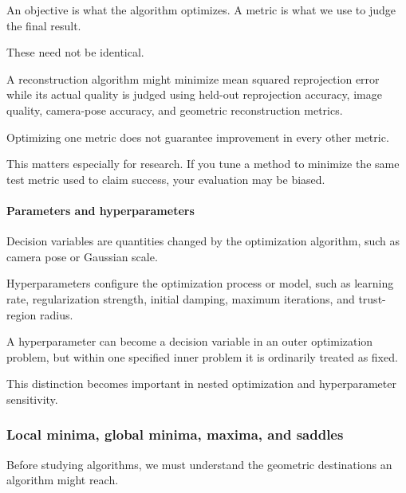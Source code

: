 \hypertarget{02-foundations-ii-ch026-objective-functions-versus-evaluation-metrics}{}

An objective is what the algorithm optimizes. A metric is what we use to judge the final result.

These need not be identical.

A reconstruction algorithm might minimize mean squared reprojection error while its actual quality is judged using held-out reprojection accuracy, image quality, camera-pose accuracy, and geometric reconstruction metrics.

Optimizing one metric does not guarantee improvement in every other metric.

This matters especially for research. If you tune a method to minimize the same test metric used to claim success, your evaluation may be biased.

\paragraph{Parameters and hyperparameters}\label{02-foundations-ii-ch026-parameters-and-hyperparameters}

\hypertarget{02-foundations-ii-ch026-parameters-and-hyperparameters}{}

Decision variables are quantities changed by the optimization algorithm, such as camera pose or Gaussian scale.

Hyperparameters configure the optimization process or model, such as learning rate, regularization strength, initial damping, maximum iterations, and trust-region radius.

A hyperparameter can become a decision variable in an outer optimization problem, but within one specified inner problem it is ordinarily treated as fixed.

This distinction becomes important in nested optimization and hyperparameter sensitivity.

\subsubsection{Local minima, global minima, maxima, and saddles}\label{02-foundations-ii-ch026-local-minima-global-minima-maxima-and-saddles}

\hypertarget{02-foundations-ii-ch026-local-minima-global-minima-maxima-and-saddles}{}

Before studying algorithms, we must understand the geometric destinations an algorithm might reach.

